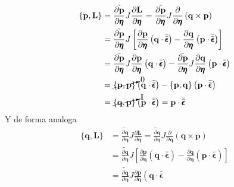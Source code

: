 \documentclass[a4paper]{article}
\begin{document}
\begin{answer}[Punto 23]
        \begin{align*}
            \left\{\mathbf{p}, \mathbf{L}\right\} &=  \tilde{\frac{\partial \mathbf p}{\partial \pmb \eta}} J  {\frac{\partial \mathbf L}{\partial \pmb \eta}} = \tilde{\frac{\partial \mathbf p}{\partial \pmb \eta}} J  {\frac{\partial}{\partial \pmb \eta}}\left(\mathbf q \times \mathbf p\right) \\
            &= \tilde{\frac{\partial \mathbf p}{\partial \pmb \eta}} J \left[\frac{\partial \mathbf p}{\partial \pmb \eta} \left( \mathbf q \cdot \bar{\bar{\pmb \epsilon}} 
            \right) - \frac{\partial \mathbf q}{\partial \pmb \eta} \left( \mathbf p\cdot \bar{\bar{\pmb \epsilon}} 
            \right)\right]\\
            &= \tilde{\frac{\partial \mathbf p}{\partial \pmb \eta}} J \frac{\partial \mathbf p}{\partial \pmb \eta} \left( \mathbf q \cdot \bar{\bar{\pmb \epsilon}} 
            \right) - \tilde{\frac{\partial \mathbf p}{\partial \pmb \eta}} J \frac{\partial \mathbf q}{\partial \pmb \eta} \left( \mathbf p\cdot \bar{\bar{\pmb \epsilon}}
            \right)\\
            &= \cancelto{0}{\left\{ \mathbf p, \mathbf p \right\}} \left( \mathbf q \cdot \bar{\bar{\pmb \epsilon}} 
            \right) - \left\{ \mathbf p, \mathbf q \right\} \left( \mathbf p\cdot \bar{\bar{\pmb \epsilon}}
            \right)\\
            &=  \cancelto{\mathbb{I}}{\left\{ \mathbf q, \mathbf p \right\}} \left( \mathbf p \cdot \bar{\bar{\pmb \epsilon}}\right) =  \mathbf p \cdot \bar{\bar{\pmb \epsilon}}\\
        \end{align*}
        Y de forma analoga
        \begin{align*}
            \{\mathbf q, \mathbf L\} &= \tilde{\frac{\partial \mathbf q}{\partial \pmb \eta}} J  {\frac{\partial \mathbf L}{\partial \pmb \eta}} = \tilde{\frac{\partial \mathbf q}{\partial \pmb \eta}} J  {\frac{\partial}{\partial \pmb \eta}}\left(\mathbf q \times \mathbf p\right) \\
            &= \tilde{\frac{\partial \mathbf q}{\partial \pmb \eta}} J \left[\frac{\partial \mathbf p}{\partial \pmb \eta} \left( \mathbf q \cdot \bar{\bar{\pmb \epsilon}}
            \right) - \frac{\partial \mathbf q}{\partial \pmb \eta} \left( \mathbf p\cdot \bar{\bar{\pmb \epsilon}}
            \right)\right]\\
            &= \tilde{\frac{\partial \mathbf q}{\partial \pmb \eta}} J \frac{\partial \mathbf p}{\partial \pmb \eta} \left( \mathbf q \cdot \bar{\bar{\pmb \epsilon}}

\end{align*}
\end{answer}
\end{document}
